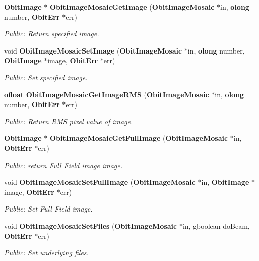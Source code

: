 \begin{CompactItemize}
{\bf Obit\-Image} $\ast$ {\bf Obit\-Image\-Mosaic\-Get\-Image} ({\bf Obit\-Image\-Mosaic} $\ast$in, {\bf olong} number, {\bf Obit\-Err} $\ast$err)
\begin{CompactList}\small\item\em Public: Return specified image. \item\end{CompactList}\item 
void {\bf Obit\-Image\-Mosaic\-Set\-Image} ({\bf Obit\-Image\-Mosaic} $\ast$in, {\bf olong} number, {\bf Obit\-Image} $\ast$image, {\bf Obit\-Err} $\ast$err)
\begin{CompactList}\small\item\em Public: Set specified image. \item\end{CompactList}\item 
{\bf ofloat} {\bf Obit\-Image\-Mosaic\-Get\-Image\-RMS} ({\bf Obit\-Image\-Mosaic} $\ast$in, {\bf olong} number, {\bf Obit\-Err} $\ast$err)
\begin{CompactList}\small\item\em Public: Return RMS pixel value of image. \item\end{CompactList}\item 
{\bf Obit\-Image} $\ast$ {\bf Obit\-Image\-Mosaic\-Get\-Full\-Image} ({\bf Obit\-Image\-Mosaic} $\ast$in, {\bf Obit\-Err} $\ast$err)
\begin{CompactList}\small\item\em Public: return Full Field image image. \item\end{CompactList}\item 
void {\bf Obit\-Image\-Mosaic\-Set\-Full\-Image} ({\bf Obit\-Image\-Mosaic} $\ast$in, {\bf Obit\-Image} $\ast$image, {\bf Obit\-Err} $\ast$err)
\begin{CompactList}\small\item\em Public: Set Full Field image. \item\end{CompactList}\item 
void {\bf Obit\-Image\-Mosaic\-Set\-Files} ({\bf Obit\-Image\-Mosaic} $\ast$in, gboolean do\-Beam, {\bf Obit\-Err} $\ast$err)
\begin{CompactList}\small\item\em Public: Set underlying files. \item\end{CompactList}\item 

\end{CompactItemize}
